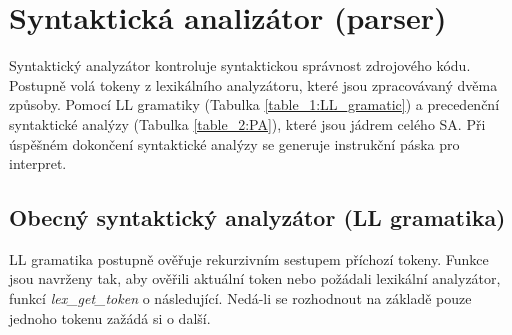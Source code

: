 \documentclass[a4paper, 11pt, titlepage]{article}
\begin{document}
\newpage
\section{Syntaktická analizátor (parser)}
Syntaktický analyzátor kontroluje syntaktickou správnost zdrojového kódu. Postupně volá tokeny z lexikálního analyzátoru, které jsou zpracovávaný dvěma způsoby. Pomocí LL gramatiky (Tabulka \ref{table_1:LL_gramatic}) a precedenční syntaktické analýzy (Tabulka \ref{table_2:PA}), které jsou jádrem celého SA. Při úspěšném dokončení syntaktické analýzy se generuje instrukční páska pro interpret.

\subsection{Obecný syntaktický analyzátor (LL gramatika)}
LL gramatika postupně ověřuje rekurzivním sestupem příchozí tokeny. Funkce jsou navrženy tak, aby ověřili aktuální token nebo požádali lexikální analyzátor, funkcí \textit{lex\_get\_token} o následující. Nedá-li se rozhodnout na základě pouze jednoho tokenu zažádá si o další.     
\end{document}
